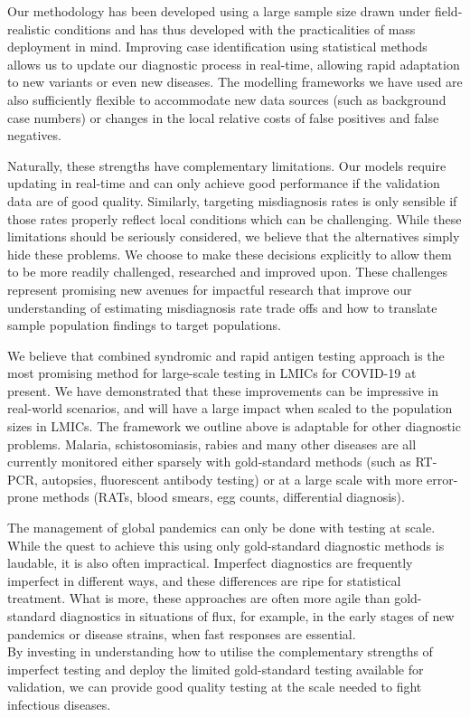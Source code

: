 \documentclass[]{elsarticle} %
\begin{document}
Our methodology has been developed using a large sample size drawn under field-realistic conditions and has thus developed with the practicalities of mass deployment in mind.
Improving case identification using statistical methods allows us to update our diagnostic process in real-time, allowing rapid adaptation to new variants or even new diseases.
The modelling frameworks we have used are also sufficiently flexible to accommodate new data sources (such as background case numbers) or changes in the local relative costs of false positives and false negatives.

Naturally, these strengths have complementary limitations.
Our models require updating in real-time and can only achieve good performance if the validation data are of good quality.
Similarly, targeting misdiagnosis rates is only sensible if those rates properly reflect local conditions which can be challenging.
While these limitations should be seriously considered, we believe that the alternatives simply hide these problems.
We choose to make these decisions explicitly to allow them to be more readily challenged, researched and improved upon.
These challenges represent promising new avenues for impactful research that improve our understanding of estimating misdiagnosis rate trade offs and how to translate sample population findings to target populations.

We believe that combined syndromic and rapid antigen testing approach is the most promising method for large-scale testing in LMICs for COVID-19 at present.
We have demonstrated that these improvements can be impressive in real-world scenarios, and will have a large impact when scaled to the population sizes in LMICs.
The framework we outline above is adaptable for other diagnostic problems.
Malaria, schistosomiasis, rabies and many other diseases are all currently monitored either sparsely with gold-standard methods (such as RT-PCR, autopsies, fluorescent antibody testing) or at a large scale with more error-prone methods (RATs, blood smears, egg counts, differential diagnosis).

The management of global pandemics can only be done with testing at scale.
While the quest to achieve this using only gold-standard diagnostic methods is laudable, it is also often impractical.
Imperfect diagnostics are frequently imperfect in different ways, and these differences are ripe for statistical treatment.
What is more, these approaches are often more agile than gold-standard diagnostics in situations of flux, for example, in the early stages of new pandemics or disease strains, when fast responses are essential.\\
By investing in understanding how to utilise the complementary strengths of imperfect testing and deploy the limited gold-standard testing available for validation, we can provide good quality testing at the scale needed to fight infectious diseases.
\end{document}
